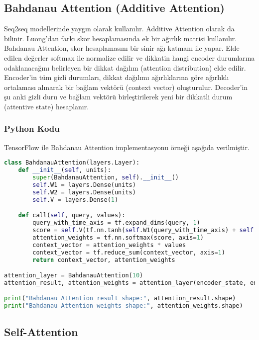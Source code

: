 \subsection{Bahdanau Attention (Additive Attention)}
Seq2seq modellerinde yaygın olarak kullanılır. Additive Attention olarak da bilinir. Luong'dan farkı skor hesaplamasında ek bir ağırlık matrisi kullanılır. Bahdanau Attention, skor hesaplamasını bir sinir ağı katmanı ile yapar. Elde edilen değerler softmax ile normalize edilir ve dikkatin hangi encoder durumlarına odaklanacağını belirleyen bir dikkat dağılım (attention distribution) elde edilir. Encoder'in tüm gizli durumları, dikkat dağılımı ağırlıklarına göre ağırlıklı ortalaması alınarak bir bağlam vektörü (context vector) oluşturulur. Decoder'in şu anki gizli duru ve bağlam vektörü birleştirilerek yeni bir dikkatli durum (attentive state) hesaplanır.

\subsubsection{Python Kodu}

TensorFlow ile Bahdanau Attention implementasyonu örneği aşağıda verilmiştir.

\begin{lstlisting}[language=Python]
class BahdanauAttention(layers.Layer):
    def __init__(self, units):
        super(BahdanauAttention, self).__init__()
        self.W1 = layers.Dense(units)
        self.W2 = layers.Dense(units)
        self.V = layers.Dense(1)

    def call(self, query, values):
        query_with_time_axis = tf.expand_dims(query, 1)
        score = self.V(tf.nn.tanh(self.W1(query_with_time_axis) + self.W2(values)))
        attention_weights = tf.nn.softmax(score, axis=1)
        context_vector = attention_weights * values
        context_vector = tf.reduce_sum(context_vector, axis=1)
        return context_vector, attention_weights

attention_layer = BahdanauAttention(10)
attention_result, attention_weights = attention_layer(encoder_state, encoder_output)

print("Bahdanau Attention result shape:", attention_result.shape)
print("Bahdanau Attention weights shape:", attention_weights.shape)
\end{lstlisting}

\subsection{Self-Attention}
Transformer modellerinin temel bileşenidir. Bir metin içindeki tüm öğelerin birbirine dikkat etmesini sağlar. Paralel hesaplama imkanı sağlar. Girdi dizisi sorgu (query), key(anahtar) ve değer vektörleri (value) olmask üzere üç farklı vektöre dönüştürülür. Sorgu ve anahtar vektörlerinin nokta çarpımı (dot product) ile skorlar hesaplanır ve ölçeklendirilir, elde edilen değerler softmax ile normalize edilir. Ağırlık ortalama alınarak yeni bir vektör elde edilir.

